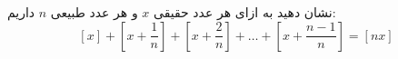 نشان دهید به ازای هر عدد حقیقی $x$ و هر عدد طبیعی  $n$‌  داریم:
$$[x]+[x+\frac{1}{n}]+[x+\frac{2}{n}]+\dots+[x+\frac{n-1}{n}]=[nx]$$